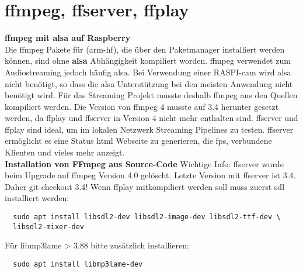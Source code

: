 \section{ffmpeg, ffserver, ffplay} \label{RefFFmpeg}
\textbf{ffmpeg mit alsa auf Raspberry}\\
Die ffmpeg Pakete für (arm-hf), die über den Paketmanager installiert werden können, sind ohne \textbf{alsa} Abhängigkeit kompiliert worden. ffmpeg verwendet zum Audiostreaming jedoch häufig alsa. Bei Verwendung einer RASPI-cam wird alsa nicht benötigt, so dass die alsa Unterstützung bei den meisten Anwendung nicht benötigt wird. Für das Streaming Projekt musste deshalb ffmpeg aus den Quellen kompiliert werden. Die Version von ffmpeg 4 musste auf 3.4 herunter gesetzt werden, da ffplay und ffserver in Version 4 nicht mehr enthalten sind. ffserver und ffplay sind ideal, um im lokalen Netzwerk Streaming Pipelines zu testen. ffserver ermöglicht es eine Status html Webseite zu generieren, die fps, verbundene Klienten und vieles mehr anzeigt.\\ 

\textbf{Installation von FFmpeg aus Source-Code}
Wichtige Info: ffserver wurde beim Upgrade auf ffmpeg Version 4.0 gelöscht. Letzte Version mit ffserver ist 3.4. Daher git checkout 3.4! Wenn ffplay mitkompiliert werden soll muss zuerst sdl installiert werden:
\begin{verbatim}
  sudo apt install libsdl2-dev libsdl2-image-dev libsdl2-ttf-dev \
  libsdl2-mixer-dev
\end{verbatim}

Für libmp3lame > 3.88 bitte zusätzlich installieren:
\begin{verbatim}
  sudo apt install libmp3lame-dev
\end{verbatim}

